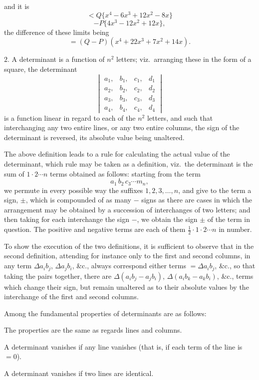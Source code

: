 \documentclass[11pt,a4paper]{article}
\theoremstyle{plain}
\theoremstyle{definition}
\begin{document}
\noindent
and it is
\[
< Q\{x^4 - 6x^3 + 12x^2 - 8x\}
\]
\[
- P\{4x^3 - 12x^2 + 12x\},
\]
the difference of these limits being
\[
= (Q - P)(x^4 + 22x^3 + 7x^2 + 14x).
\]

$2.$ A determinant is a function of $n^2$ letters; viz.\ arranging these in the form of
a square, the determinant
\[
\begin{vmatrix} a_1, & b_1, & c_1, & d_1 \\ a_2, & b_2, & c_2, & d_2 \\ a_3, & b_3, & c_3, & d_3 \\ a_4, & b_4, & c_4, & d_4 \end{vmatrix}
\]
is a function linear in regard to each of the $n^2$ letters, and such that interchanging
any two entire lines, or any two entire columns, the sign of the determinant is reversed,
its absolute value being unaltered.

The above definition leads to a rule for calculating the actual value of the determinant, which rule may be taken as a definition, viz.\ the determinant is the sum of
$1 \cdot 2 \cdots n$ terms obtained as follows: starting from the term
\[
a_1\,b_2\,c_3 \cdots m_n,
\]
we permute in every possible way the suffixes $1, 2, 3, \ldots, n$, and give to the term a
sign, $\pm$, which is compounded of as many $-$ signs as there are cases in which the arrangement may be obtained by a succession of interchanges of two letters; and then taking
for each interchange the sign $-$, we obtain the sign $\pm$ of the term in question. The
positive and negative terms are each of them $\tfrac{1}{2} \cdot 1 \cdot 2 \cdots n$ in number.

To show the execution of the two definitions, it is sufficient to observe that in
the second definition, attending for instance only to the first and second columns, in
any term $\Delta a_i b_j$, $\Delta a_j b_i$, \&c., always correspond either terms $= \Delta a_i b_j$, \&c., so
that taking the pairs together, there are $\Delta(a_i b_j - a_j b_i)$, $\Delta(a_i b_k - a_k b_i)$, \&c., terms
which change their sign, but remain unaltered as to their absolute values by the
interchange of the first and second columns.

Among the fundamental properties of determinants are as follows:

The properties are the same as regards lines and columns.

A determinant vanishes if any line vanishes (that is, if each term of the line is $= 0$).

A determinant vanishes if two lines are identical.
\end{document}
